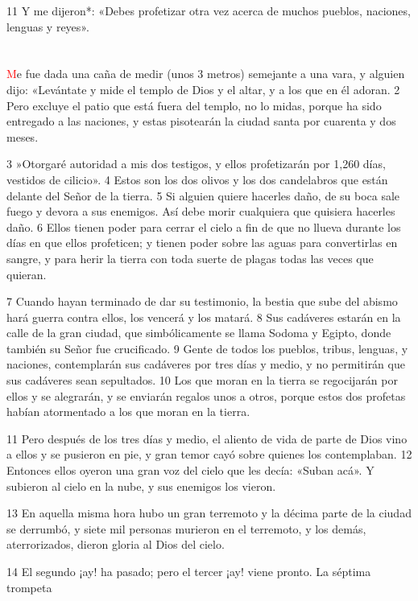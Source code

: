\documentclass[12pt,twocolumn,twoside]{book}
\begin{document}
11 Y me dijeron*: «Debes profetizar otra vez acerca de muchos pueblos, naciones, lenguas y reyes».
\chapter{}
\lettrine[lines=4]{\textcolor{red}{M}}{}e fue dada una caña de medir (unos 3 metros) semejante a una vara, y alguien dijo: «Levántate y mide el templo de Dios y el altar, y a los que en él adoran. 2 Pero excluye el patio que está fuera del templo, no lo midas, porque ha sido entregado a las naciones, y estas pisotearán la ciudad santa por cuarenta y dos meses.

3 »Otorgaré autoridad a mis dos testigos, y ellos profetizarán por 1,260 días, vestidos de cilicio». 4 Estos son los dos olivos y los dos candelabros que están delante del Señor de la tierra. 5 Si alguien quiere hacerles daño, de su boca sale fuego y devora a sus enemigos. Así debe morir cualquiera que quisiera hacerles daño. 6 Ellos tienen poder para cerrar el cielo a fin de que no llueva durante los días en que ellos profeticen; y tienen poder sobre las aguas para convertirlas en sangre, y para herir la tierra con toda suerte de plagas todas las veces que quieran.

7 Cuando hayan terminado de dar su testimonio, la bestia que sube del abismo hará guerra contra ellos, los vencerá y los matará. 8 Sus cadáveres estarán en la calle de la gran ciudad, que simbólicamente se llama Sodoma y Egipto, donde también su Señor fue crucificado. 9 Gente de todos los pueblos, tribus, lenguas, y naciones, contemplarán sus cadáveres por tres días y medio, y no permitirán que sus cadáveres sean sepultados. 10 Los que moran en la tierra se regocijarán por ellos y se alegrarán, y se enviarán regalos unos a otros, porque estos dos profetas habían atormentado a los que moran en la tierra.

11 Pero después de los tres días y medio, el aliento de vida de parte de Dios vino a ellos y se pusieron en pie, y gran temor cayó sobre quienes los contemplaban. 12 Entonces ellos oyeron una gran voz del cielo que les decía: «Suban acá». Y subieron al cielo en la nube, y sus enemigos los vieron.

13 En aquella misma hora hubo un gran terremoto y la décima parte de la ciudad se derrumbó, y siete mil personas murieron en el terremoto, y los demás, aterrorizados, dieron gloria al Dios del cielo.

14 El segundo ¡ay! ha pasado; pero el tercer ¡ay! viene pronto.
La séptima trompeta
\end{document}
